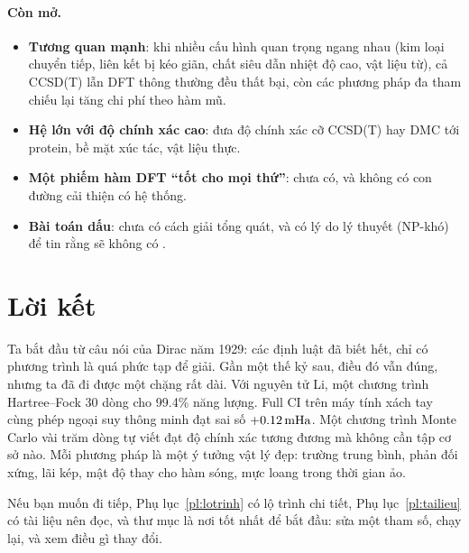 \paragraph{Còn mở.}
\begin{itemize}
\item \textbf{Tương quan mạnh}: khi nhiều cấu hình quan trọng ngang nhau (kim loại chuyển tiếp, liên kết bị kéo giãn, chất siêu dẫn nhiệt độ cao, vật liệu từ), cả CCSD(T) lẫn DFT thông thường đều thất bại, còn các phương pháp đa tham chiếu lại tăng chi phí theo hàm mũ.
\item \textbf{Hệ lớn với độ chính xác cao}: đưa độ chính xác cỡ CCSD(T) hay DMC tới protein, bề mặt xúc tác, vật liệu thực.
\item \textbf{Một phiếm hàm DFT ``tốt cho mọi thứ''}: chưa có, và không có con đường cải thiện có hệ thống.
\item \textbf{Bài toán dấu}: chưa có cách giải tổng quát, và có lý do lý thuyết (NP-khó) để tin rằng sẽ không có \cite{TroyerWiese2005}.
\end{itemize}

\section{Lời kết}

Ta bắt đầu từ câu nói của Dirac năm 1929: các định luật đã biết hết, chỉ có phương trình là quá phức tạp để giải. Gần một thế kỷ sau, điều đó vẫn đúng, nhưng ta đã đi được một chặng rất dài. Với nguyên tử Li, một chương trình Hartree--Fock 30 dòng cho 99.4\% năng lượng. Full CI trên máy tính xách tay cùng phép ngoại suy thông minh đạt sai số $+0.12\,\mathrm{mHa}$. Một chương trình Monte Carlo vài trăm dòng tự viết đạt độ chính xác tương đương mà không cần tập cơ sở nào. Mỗi phương pháp là một ý tưởng vật lý đẹp: trường trung bình, phản đối xứng, lãi kép, mật độ thay cho hàm sóng, mực loang trong thời gian ảo.

Nếu bạn muốn đi tiếp, Phụ lục~\ref{pl:lotrinh} có lộ trình chi tiết, Phụ lục~\ref{pl:tailieu} có tài liệu nên đọc, và thư mục  là nơi tốt nhất để bắt đầu: sửa một tham số, chạy lại, và xem điều gì thay đổi.

